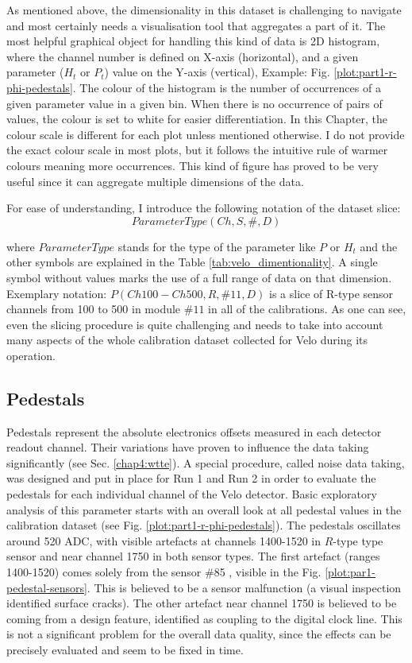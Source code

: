 As mentioned above, the dimensionality in this dataset is challenging to navigate and most certainly needs a visualisation tool that aggregates a part of it.
The most helpful graphical object for handling this kind of data is 2D histogram, where the channel number is defined on X-axis (horizontal), and a given parameter ($H_{t}$ or $P_{t}$) value on the Y-axis (vertical), Example: Fig. \ref{plot:part1-r-phi-pedestals}.
The colour of the histogram is the number of occurrences of a given parameter value in a given bin.
When there is no occurrence of pairs of values, the colour is set to white for easier differentiation.
In this Chapter, the colour scale is different for each plot unless mentioned otherwise.
I do not provide the exact colour scale in most plots, but it follows the intuitive rule of warmer colours meaning more occurrences.
This kind of figure has proved to be very useful since it can aggregate multiple dimensions of the data.

For ease of understanding, I introduce the following notation of the dataset slice: 
$$
ParameterType(Ch, S, \#, D)
$$

where $ParameterType$ stands for the type of the parameter like $P$ or $H_t$ and the other symbols are explained in the Table \ref{tab:velo_dimentionality}.
A single symbol without values marks the use of a full range of data on that dimension.
Exemplary notation: $P(Ch100-Ch500, R, \#11, D)$ is a slice of R-type sensor channels from 100 to 500 in module $\#11$ in all of the calibrations. As one can see, even the slicing procedure is quite challenging and needs to take into account many aspects of the whole calibration dataset collected for Velo during its operation.

\subsection{Pedestals}

Pedestals represent the absolute electronics offsets measured in each detector readout channel. Their variations have proven to influence the data taking significantly (see Sec. \ref{chap4:wtte}). A special procedure, called noise data taking, was designed and put in place for Run 1 and Run 2 in order to evaluate the pedestals for each individual channel of the Velo detector.
Basic exploratory analysis of this parameter starts with an overall look at all pedestal values in the calibration dataset (see Fig. \ref{plot:part1-r-phi-pedestals}).
The pedestals oscillates around 520 ADC, with visible artefacts at channels 1400-1520 in $R$-type type sensor and near channel 1750 in both sensor types.
The first artefact (ranges 1400-1520) comes solely from the sensor \#85
, visible in the Fig. \ref{plot:par1-pedestal-sensors}. This is believed to be a sensor malfunction (a visual inspection identified surface cracks). 
The other artefact near channel 1750 is believed to be coming from a design feature, identified as coupling to the digital clock line. 
This is not a significant problem for the overall data quality, since the effects can be precisely evaluated and seem to be fixed in time.


